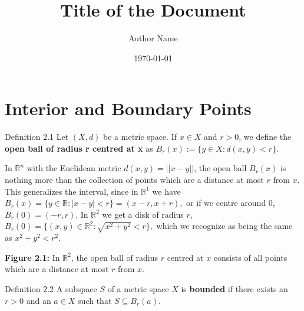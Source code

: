 \documentclass{article}
\title{\textbf{Title of the Document}}
\author{Author Name}
\date{\today}
\theoremstyle{definition}
\numberwithin{equation}{section}
\begin{document}
\maketitle
\tableofcontents
\newpage
\section{Interior and Boundary Points}

\begin{mydefbox}{Definition 2.1}
Let $(X,d)$ be a metric space. If $ x \in X $ and $ r > 0 $, we define the \textbf{open ball of radius r centred at x} as 
$ 
B_{r}(x) := \{ y \in X : d(x,y) < r \}. 
$
\end{mydefbox}

In $\mathbb{R}^{n}$ with the Euclidean metric $d(x,y) = || x - y || $, the open ball $B_{r}(x)$ is nothing more than the collection of points which are a distance at most $r$ from $x$. This generalizes the interval, since in $\mathbb{R}^{1}$ we have 
$ 
B_{r}(x) = \{ y \in \mathbb{R} : |x - y| < r \} = (x - r, x + r), 
$
or if we centre around $0$, $ B_{r}(0) = (-r, r)$. In $\mathbb{R}^{2} $ we get a disk of radius $r,$ 
$ 
B_{r}(0) = \{ (x,y) \in \mathbb{R}^{2} : \sqrt{x^{2} + y^{2}} < r \}, 
$
which we recognize as being the same as $x^{2} + y^{2} < r^{2}.$

\begin{center}
\end{center}

\begin{center}
\textbf{Figure 2.1:} In $\mathbb{R}^{2}$, the open ball of radius $r$ centred at $x$ consists of all points which are a distance at most $r$ from $x$.
\end{center}

\begin{mydefbox}{Definition 2.2}
A subspace $S$ of a metric space $X$ is \textbf{bounded} if there exists an $r > 0$ and an $a \in X$ such that $S \subseteq B_{r}(a)$.
\end{mydefbox}
\end{document}
